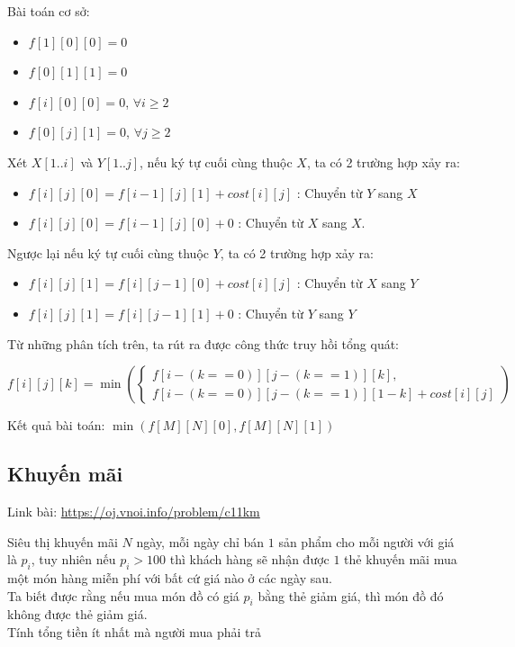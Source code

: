 \documentclass{article}
\begin{document}
Bài toán cơ sở:
\begin{itemize}
    \item $f[1][0][0] = 0$
    \item $f[0][1][1] = 0$
    \item $f[i][0][0] = 0$, $\forall i \geq 2$
    \item $f[0][j][1] = 0$, $\forall j \geq 2$
\end{itemize}

Xét $X[1..i]$ và $Y[1..j]$, nếu ký tự cuối cùng thuộc $X$, ta có 2 trường hợp xảy ra:

\begin{itemize}
    \item $f[i][j][0] = f[i - 1][j][1] + cost[i][j]$ : Chuyển từ $Y$ sang $X$ 
    \item $f[i][j][0] = f[i - 1][j][0] + 0$ : Chuyển từ $X$ sang $X$.
\end{itemize}
    
Ngược lại nếu ký tự cuối cùng thuộc $Y$, ta có 2 trường hợp xảy ra:
\begin{itemize}
    \item $f[i][j][1] = f[i][j - 1][0] + cost[i][j]$ : Chuyển từ $X$ sang $Y$
    \item $f[i][j][1] = f[i][j - 1][1] + 0$ : Chuyển từ $Y$ sang $Y$
\end{itemize}

Từ những phân tích trên, ta rút ra được công thức truy hồi tổng quát:


\[
f[i][j][k] = \min ( 
    \begin{cases}
        f[i - (k == 0)][j - (k == 1)][k], \\
        f[i - (k == 0)][j - (k == 1)][1 - k] + cost[i][j]
    \end{cases}
    )
\]

Kết quả bài toán: $\min(f[M][N][0], f[M][N][1])$

\subsection{Khuyến mãi}
Link bài: \url{https://oj.vnoi.info/problem/c11km}

\begin{tcolorbox}[
    colback=blue!5,        %
    colframe=blue!75!black,%
    title={Đề bài}
]
Siêu thị khuyến mãi $N$ ngày, mỗi ngày chỉ bán $1$ sản phẩm cho mỗi người với giá là $p_i$, tuy nhiên nếu $p_i > 100$ thì khách hàng sẽ nhận được $1$ thẻ khuyến mãi mua một món hàng miễn phí với bất cứ giá nào ở các ngày sau.\\

Ta biết được rằng nếu mua món đồ có giá $p_i$ bằng thẻ giảm giá, thì món đồ đó không được thẻ giảm giá.\\ 

Tính tổng tiền ít nhất mà người mua phải trả
\end{tcolorbox}
\end{document}
